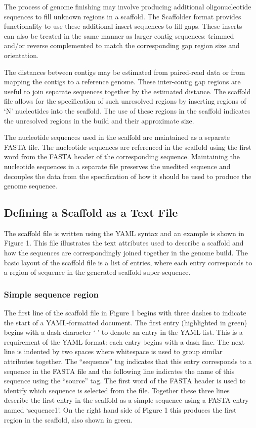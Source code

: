\documentclass[10pt]{bmc_article}
\newenvironment{bmcformat}{\begin{raggedright}\baselineskip20pt\sloppy\setboolean{publ}{false}}{\end{raggedright}\baselineskip20pt\sloppy}
\begin{document}
\begin{bmcformat}
The process of genome finishing may involve producing additional
oligonucleotide sequences to fill unknown regions in a scaffold. The Scaffolder
format provides functionality to use these additional insert sequences to fill
gaps. These inserts can also be treated in the same manner as larger contig
sequences: trimmed and/or reverse complemented to match the corresponding gap
region size and orientation. \pb

The distances between contigs may be estimated from paired-read data or from
mapping the contigs to a reference genome. These inter-contig gap regions are
useful to join separate sequences together by the estimated distance. The
scaffold file allows for the specification of such unresolved regions by
inserting regions of `N' nucleotides into the scaffold. The use of these
regions in the scaffold indicates the unresolved regions in the build and their
approximate size. \pb

The nucleotide sequences used in the scaffold are maintained as a separate
FASTA file. The nucleotide sequences are referenced in the scaffold using the
first word from the FASTA header of the corresponding sequence. Maintaining the
nucleotide sequences in a separate file preserves the unedited sequence and
decouples the data from the specification of how it should be used to produce
the genome sequence. \pb

\subsection*{Defining a Scaffold as a Text File} %

The scaffold file is written using the YAML syntax and an example is shown in
Figure 1. This file illustrates the text attributes used to describe a scaffold
and how the sequences are correspondingly joined together in the genome build.
The basic layout of the scaffold file is a list of entries, where each entry
corresponds to a region of sequence in the generated scaffold super-sequence.
\pb

\subsubsection*{Simple sequence region} %

The first line of the scaffold file in Figure 1 begins with three dashes to
indicate the start of a YAML-formatted document. The first entry (highlighted
in green) begins with a dash character `-' to denote an entry in the YAML list.
This is a requirement of the YAML format: each entry begins with a dash line.
The next line is indented by two spaces where whitespace is used to group
similar attributes together. The ``sequence'' tag indicates that this entry
corresponds to a sequence in the FASTA file and the following line indicates
the name of this sequence using the ``source'' tag. The first word of the FASTA
header is used to identify which sequence is selected from the file. Together
these three lines describe the first entry in the scaffold as a simple sequence
using a FASTA entry named `sequence1'. On the right hand side of Figure 1 this
produces the first region in the scaffold, also shown in green. \pb


\end{bmcformat}
\end{document}
